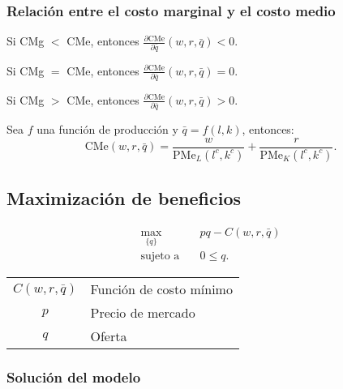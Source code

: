 \documentclass[8pt,a4paper]{extarticle}
\begin{document}
\begin{multicols}{3}
\subsubsection*{Relación entre el costo marginal y el costo medio}

\begin{eqlist}
\item Si CMg $<$ CMe, entonces $\displaystyle \frac{\partial \text{CMe}}{\partial \bar{q}} (w, r, \bar{q}) < 0$.
\item Si CMg $=$ CMe, entonces $\displaystyle \frac{\partial \text{CMe}}{\partial \bar{q}} (w, r, \bar{q}) = 0$.
\item Si CMg $>$ CMe, entonces $\displaystyle \frac{\partial \text{CMe}}{\partial \bar{q}} (w, r, \bar{q}) > 0$.
\end{eqlist}

\begin{boxcor}
	Sea $f$ una función de producción y $\bar{q} = f(l, k)$, entonces:
	\[
		\text{CMe} (w, r, \bar{q}) = \frac{w}{\text{PMe}_L (l^c, k^c)} + \frac{r}{\text{PMe}_K (l^c, k^c)}
	.\] 
\end{boxcor}

\newpage

\subsection{Maximización de beneficios}

\begin{equation*}
\begin{aligned}
	\max_{\{q\}}\         & pq - C(w, r, \bar{q}) \\
    \text{sujeto a} \quad & 0 \le q.
\end{aligned}
\end{equation*}

\begin{center}
\begin{tabular}{ c l }
    \hline
	$C(w, r, \bar{q})$ & Función de costo mínimo \\
    $p$ & Precio de mercado \\
    $q$ & Oferta \\
    \hline
\end{tabular}
\end{center}

\subsubsection*{Solución del modelo}


\end{multicols}
\end{document}
